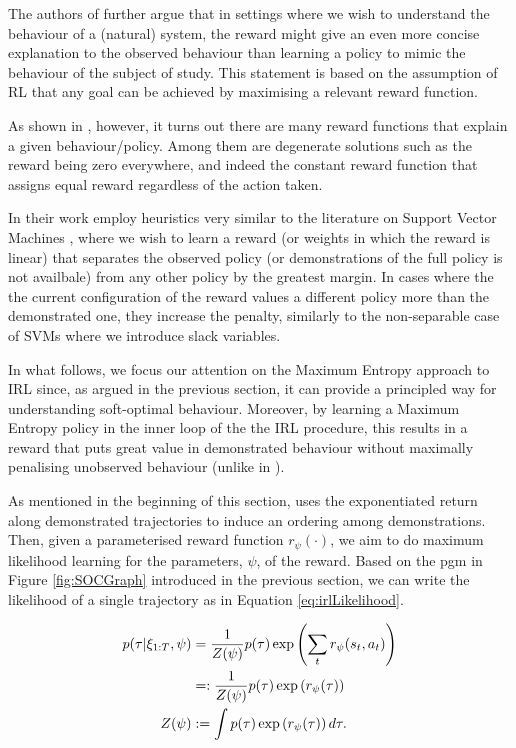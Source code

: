 \documentclass{report}
\numberwithin{equation}{section}
\numberwithin{figure}{section}
\numberwithin{table}{section}
\numberwithin{algorithm}{section}
\begin{document}
The authors of \cite{NgIRL} 
further argue that in settings where we wish to understand 
the behaviour of a (natural) system, the reward might give an even 
more concise explanation to the observed behaviour 
than learning a policy to mimic the behaviour of the subject 
of study. This statement is based on the assumption 
of RL that any goal can be achieved by maximising a relevant reward 
function.

As shown in \cite{NgIRL}, however, it turns out there are many 
reward functions that explain a given behaviour/policy. Among 
them are degenerate solutions such as the 
reward being zero everywhere, 
and indeed the constant reward function that assigns equal reward 
regardless of the action taken.

In their work \cite{NgIRL} employ heuristics very similar to the 
literature on Support Vector Machines \citep{SVMs}, where we 
wish to learn a reward (or weights in which the reward is linear) 
that separates the observed policy (or demonstrations of 
the full policy is not availbale) from any other policy by the 
greatest margin. In cases where the the current configuration 
of the reward values a different policy more than the demonstrated 
one, they increase the penalty, similarly to the non-separable 
case of SVMs where we introduce slack variables.

In what follows, we focus our attention on the Maximum Entropy 
approach to IRL \citep{Ziebart2008} since, 
as argued in the previous section, it can provide a principled 
way for understanding soft-optimal behaviour. 
Moreover, by learning a Maximum Entropy policy in the 
inner loop of the the IRL procedure, this results in a reward 
that puts great value in demonstrated behaviour without 
maximally penalising unobserved behaviour (unlike 
in \cite{NgIRL}).

As mentioned in the beginning of this section, \cite{Ziebart2008} 
uses the exponentiated return along demonstrated trajectories 
to induce an ordering among demonstrations. Then, given 
a parameterised reward function $r_\psi(\cdot)$, 
we aim to do maximum likelihood learning for the 
parameters, $\psi$, of the reward. Based on the pgm in Figure
\ref{fig:SOCGraph} introduced in the previous section, we can 
write the likelihood of a single trajectory 
as in Equation \ref{eq:irlLikelihood}.

\begin{align}\label{eq:irlLikelihood}
  p(\tau|\xi_{1:T},\psi)&=\frac{1}{Z(\psi)}p(\tau)\exp\left(\sum_{t}r_\psi(s_t,a_t)\right)\notag\\
  &=:\frac{1}{Z(\psi)}p(\tau)\exp\left(r_\psi(\tau)\right)\notag\\
  Z(\psi)&:=\int p(\tau)\exp\left(
    r_\psi (\tau)
  \right)d\tau.
\end{align}
\end{document}
